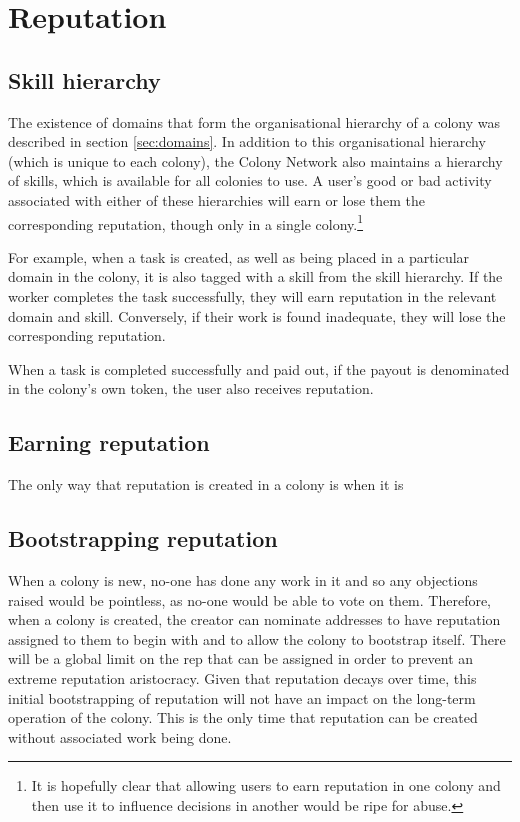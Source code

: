\section{Reputation}



\subsection{Skill hierarchy}

The existence of domains that form the organisational hierarchy of a colony was described in section \ref{sec:domains}. In addition to this organisational hierarchy (which is unique to each colony), the Colony Network also maintains a hierarchy of skills, which is available for all colonies to use. A user's good or bad activity associated with either of these hierarchies will earn or lose them the corresponding reputation, though only in a single colony.\footnote{It is hopefully clear that allowing users to earn reputation in one colony and then use it to influence decisions in another would be ripe for abuse.}

For example, when a task is created, as well as being placed in a particular domain in the colony, it is also tagged with a skill from the skill hierarchy. If the worker completes the task successfully, they will earn reputation in the relevant domain and skill. Conversely, if their work is found inadequate, they will lose the corresponding reputation.

When a task is completed successfully and paid out, if the payout is denominated in the colony's own token, the user also receives reputation. 

\subsection{Earning reputation}
The only way that reputation is created in a colony is when it is 

\subsection{Bootstrapping reputation}

When a colony is new, no-one has done any work in it and so any objections raised would be pointless, as no-one would be able to vote on them. Therefore, when a colony is created, the creator can nominate addresses to have reputation assigned to them to begin with and to allow the colony to bootstrap itself. There will be a global limit on the rep that can be assigned in order to prevent an extreme reputation aristocracy. Given that reputation decays over time, this initial bootstrapping of reputation will not have an impact on the long-term operation of the colony. This is the only time that reputation can be created without associated work being done.

